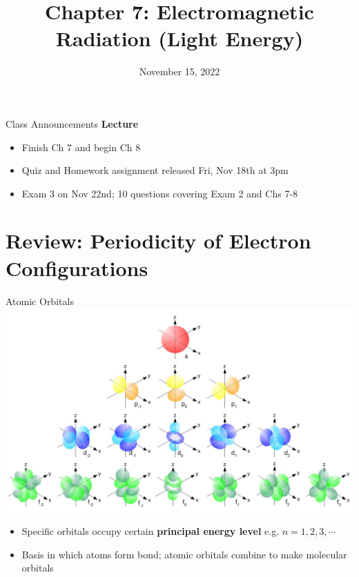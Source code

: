 \documentclass[11pt]{beamer}
\title{Chapter 7: Electromagnetic Radiation (Light Energy)}
\institute{Chemistry Department, Cypress College}
\date{November 15, 2022}
\begin{document}
\begin{frame}
  \titlepage
\end{frame}

\begin{frame}{Class Announcements}
  \textbf{Lecture}
  \begin{itemize}
  \item Finish Ch 7 and begin Ch 8
  \item Quiz and Homework assignment released Fri, Nov 18th at 3pm
  \item Exam 3 on Nov 22nd; 10 questions covering Exam 2 and
    Chs 7-8
  \end{itemize}
\end{frame}


\section{Review: Periodicity of Electron Configurations}

\begin{frame}{Atomic Orbitals}
  \centering
  \includegraphics[width=0.8\linewidth]{single_elect_orb}
  \begin{itemize}
  \item Specific orbitals occupy certain \textbf{principal energy level} e.g.
    $n = 1, 2, 3, \cdots$
  \item Basis in which atoms form bond; atomic orbitals combine to make
    molecular orbitals
  \end{itemize}
\end{frame}
\end{document}
